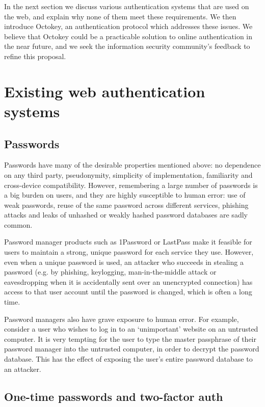 In the next section we discuss various authentication systems that are used on the web, and explain
why none of them meet these requirements. We then introduce Octokey, an authentication protocol
which addresses these issues. We believe that Octokey could be a practicable solution to online
authentication in the near future, and we seek the information security community's feedback to
refine this proposal.

\section{Existing web authentication systems}
\subsection{Passwords}

Passwords have many of the desirable properties mentioned above: no dependence on any third party,
pseudonymity, simplicity of implementation, familiarity and cross-device compatibility. However,
remembering a large number of passwords is a big burden on users, and they are highly susceptible to
human error: use of weak passwords, reuse of the same password across different services, phishing
attacks and leaks of unhashed or weakly hashed password databases are sadly common.

Password manager products such as 1Password or LastPass make it feasible for users to maintain a
strong, unique password for each service they use. However, even when a unique password is used, an
attacker who succeeds in stealing a password (e.g. by phishing, keylogging, man-in-the-middle attack
or eavesdropping when it is accidentally sent over an unencrypted connection) has access to that
user account until the password is changed, which is often a long time.

Password managers also have grave exposure to human error. For example, consider a user who wishes
to log in to an `unimportant' website on an untrusted computer. It is very tempting for the user to
type the master passphrase of their password manager into the untrusted computer, in order to
decrypt the password database. This has the effect of exposing the user's entire password database
to an attacker.

\subsection{One-time passwords and two-factor auth}

